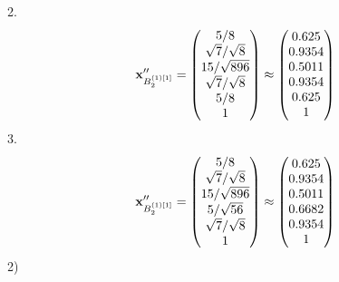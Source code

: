 \documentclass[10pt,a4paper]{article}
\begin{document}
	2.
	\[
		\bold{x}''_{B_2^{(1)[1]}} = 
		\begin{pmatrix}
			{{5}} / {{8}} \\
			{\sqrt{7}} / {\sqrt{8}} \\
			{{15}} / {\sqrt{896}} \\
			{\sqrt{7}} / {\sqrt{8}} \\
			{{5}} / {{8}} \\
			{1}{} \\
		\end{pmatrix}
		\approx
		\begin{pmatrix}
			0.625    \\
			0.9354   \\
			0.5011   \\
			0.9354   \\
			0.625    \\
			1        \\
		\end{pmatrix}
	\]
	3.
	\[
		\bold{x}''_{B_2^{(1)[1]}} = 
		\begin{pmatrix}
			{{5}} / {{8}} \\
			{\sqrt{7}} / {\sqrt{8}} \\
			{{15}} / {\sqrt{896}} \\
			{{5}} / {\sqrt{56}} \\
			{\sqrt{7}} / {\sqrt{8}} \\
			{1}{} \\
		\end{pmatrix}
		\approx
		\begin{pmatrix}
			0.625    \\
			0.9354   \\
			0.5011   \\
			0.6682   \\
			0.9354   \\
			1        \\
		\end{pmatrix}
	\]
	2)
\end{document}
